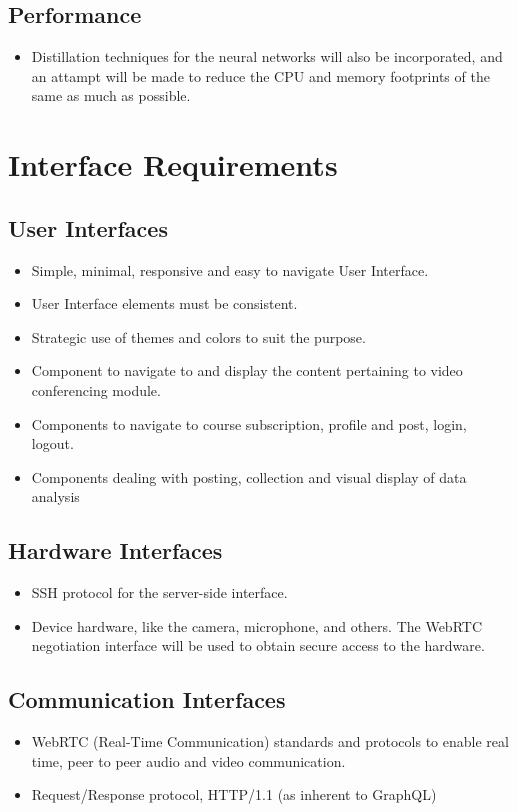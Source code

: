 \subsection{Performance}
\begin{itemize}
    \item Distillation techniques for the neural networks will also be incorporated,
    and an attampt will be made to reduce the CPU and memory footprints of the same as much as possible.
\end{itemize}

\section{Interface Requirements}

\subsection{User Interfaces}
\begin{itemize}
    \item Simple, minimal, responsive and easy to navigate User Interface.
    \item User Interface elements must be consistent.
    \item Strategic use of themes and colors to suit the purpose.
    \item Component to navigate to and display the content pertaining to video conferencing module.
    \item Components to navigate to course subscription, profile and post, login, logout.
    \item Components dealing with posting, collection and visual display of data analysis
\end{itemize}

\subsection{Hardware Interfaces}
\begin{itemize}
    \item SSH protocol for the server-side interface.
    \item Device hardware, like the camera, microphone, and others. 
    The WebRTC negotiation interface will be used to obtain secure access to the hardware.
\end{itemize}

\subsection{Communication Interfaces}
\begin{itemize}
    \item WebRTC (Real-Time Communication) standards and protocols to enable real time, peer to peer audio and video communication.
    \item Request/Response protocol, HTTP/1.1 (as inherent to GraphQL)
\end{itemize}


